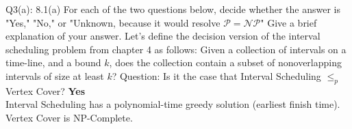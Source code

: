 \begin{problem}
    {Q3(a): 8.1(a)}
    For each of the two questions below, decide whether the answer is "Yes," "No," or "Unknown, because it would resolve $\mathcal{P} = \mathcal{NP}$"
    Give a brief explanation of your answer.
    Let's define the decision version of the interval scheduling problem from chapter 4 as follows: Given a collection of intervals on a time-line, and
    a bound $k$, does the collection contain a subset of nonoverlapping intervals of size at least $k$?
    Question: Is it the case that Interval Scheduling $\leq_{p}$ Vertex Cover?
    \textbf{Yes} \\
    Interval Scheduling has a polynomial-time greedy solution (earliest finish time). Vertex Cover is NP-Complete.
\end{problem}
